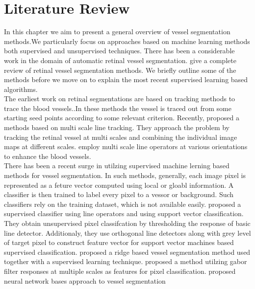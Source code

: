 \section{Literature Review}
In this chapter we aim to present a general overview of vessel segmentation methods.We particularly focus on approaches based on machine learning methods both supervised and unsupervised techniques. There has been a considerable work in the domain of automatic retinal vessel segmentation. \citet{surveyretinal} give a complete review of retinal vessel segmentation methods. We briefly outline some of the methods before we move on to explain the most recent supervised learning based algorithms.\\

The earliest work on retinal segmentations are based on tracking methods to trace the blood vessels\cite{trackingchutatape1998retinal,trackingtolias1998fuzzy}..In these methods the vessel is traced out from some starting seed points according to some relevant criterion. Recently,\citet{vlachos2010multi} proposed a methods based on multi scale line tracking. They approach the problem by tracking the retinal vessel at multi scales and combining the individual image maps at different scales.\citet{farnell2008enhancement} employ multi scale line operators at various orientations to enhance the blood vessels.\\

There has been a recent surge in utilzing supervised machine lerning based methods for vessel segmentation. In such methods, generally, each image pixel is represented as a feture vector computed using local or gloabl information. A classifier is then trained to label every pixel to a vessor or background. Such classifiers rely on the training dataset, which is not available easily.\citet{ricci2007retinal} proposed a supervised classifier using line operators and using support vector classification. They obtain unsupervised pixel classifcation by thresholding the response of basic line detector. Additionaly, they use orthogonal line detectors along with grey level of target pixel to construct feature vector for support vector machines based supervised classification.\citet{staal2004ridge} proposed a ridge based vessel segmentation method used together with a supervised learning technique.\citet{nguyen2011effective} proposed a method utilzing gabor filter responses at multiple scales as features for pixel classification.\cite{vega2013blood,gardner1996automatic} proposed neural network bases approach to vessel segmentation\\

